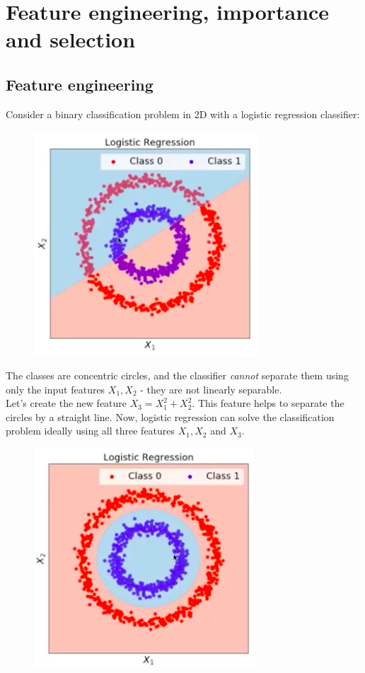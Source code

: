 \section{Feature engineering, importance and selection}


\subsection{Feature engineering}
\begin{frameex}
Consider a binary classification problem in 2D with a logistic regression classifier:
\begin{figure}[H]
\centering
\includegraphics[scale=0.4]{circles.png}
\end{figure}
The classes are concentric circles, and the classifier \textit{cannot} separate them using only the input features $X_1, X_2$ - they are not linearly separable.\\

Let's create the new feature $X_3 = X_1^2 + X_2^2$. This feature helps to separate the circles by a straight line. Now, logistic regression can solve the classification problem ideally using all three features $X_1, X_2$ and $X_3$. 

\begin{figure}[H]
\centering
\includegraphics[scale=0.4]{circles2.png}

\end{figure}
\end{frameex}

